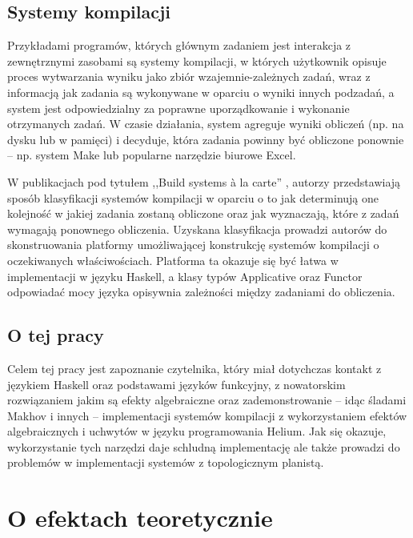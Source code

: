 \documentclass[shortabstract]{iithesis}
\begin{document}
\section{Systemy kompilacji}

Przykładami programów, których głównym zadaniem jest interakcja z zewnętrznymi zasobami są systemy kompilacji, w których użytkownik opisuje proces wytwarzania wyniku jako zbiór wzajemnie-zależnych zadań, wraz z informacją jak zadania są wykonywane w oparciu o wyniki innych podzadań, a system jest odpowiedzialny za poprawne uporządkowanie i wykonanie otrzymanych zadań. W czasie działania, system agreguje wyniki obliczeń (np. na dysku lub w pamięci) i decyduje, która zadania powinny być obliczone ponownie -- np. system Make lub popularne narzędzie biurowe Excel.

W publikacjach pod tytułem ,,Build systems {\`a} la carte'' \cite{mokhov2018build} \cite{mokhov2020build}, autorzy przedstawiają sposób klasyfikacji systemów kompilacji w oparciu o to jak determinują one kolejność w jakiej zadania zostaną obliczone oraz jak wyznaczają, które z zadań wymagają ponownego obliczenia. Uzyskana klasyfikacja prowadzi autorów do skonstruowania platformy umożliwającej konstrukcję systemów kompilacji o oczekiwanych właściwościach. Platforma ta okazuje się być łatwa w implementacji w języku Haskell, a klasy typów Applicative oraz Functor odpowiadać mocy języka opisywnia zależności między zadaniami do obliczenia.

\section{O tej pracy}

Celem tej pracy jest zapoznanie czytelnika, który miał dotychczas kontakt z językiem Haskell oraz podstawami języków funkcyjny, z nowatorskim rozwiązaniem jakim są efekty algebraiczne oraz zademonstrowanie -- idąc śladami Makhov i innych \cite{mokhov2018build} -- implementacji systemów kompilacji z wykorzystaniem efektów algebraicznych i uchwytów w języku programowania Helium. Jak się okazuje, wykorzystanie tych narzędzi daje schludną implementację ale także prowadzi do problemów w implementacji systemów z topologicznym planistą.





\chapter{O efektach teoretycznie}
\end{document}
